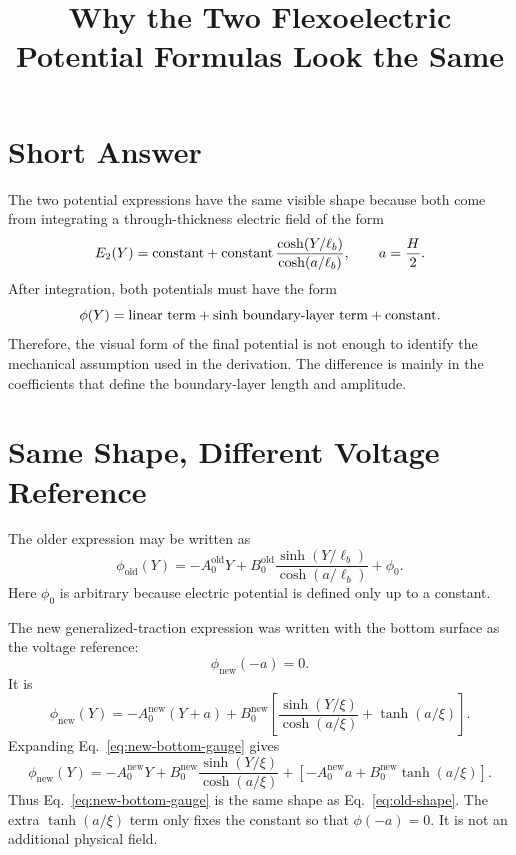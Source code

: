 \documentclass[11pt]{article}
\title{Why the Two Flexoelectric Potential Formulas Look the Same}
\author{}
\date{}
\begin{document}
\maketitle

\section{Short Answer}

The two potential expressions have the same visible shape because both come from
integrating a through-thickness electric field of the form
\[
  E_2(Y)=\hbox{constant}
  +\hbox{constant}\,
  \frac{\cosh(Y/\ell_b)}{\cosh(a/\ell_b)},
  \qquad a=\frac{H}{2}.
\]
After integration, both potentials must have the form
\[
  \phi(Y)
  =
  \hbox{linear term}
  +
  \hbox{sinh boundary-layer term}
  +
  \hbox{constant}.
\]
Therefore, the visual form of the final potential is not enough to identify the
mechanical assumption used in the derivation.  The difference is mainly in the
coefficients that define the boundary-layer length and amplitude.

\section{Same Shape, Different Voltage Reference}

The older expression may be written as
\begin{equation}
  \phi_{\mathrm{old}}(Y)
  =
  -A_0^{\mathrm{old}}Y
  +
  B_0^{\mathrm{old}}
  \frac{\sinh(Y/\ell_b)}{\cosh(a/\ell_b)}
  +
  \phi_0 .
  \label{eq:old-shape}
\end{equation}
Here \(\phi_0\) is arbitrary because electric potential is defined only up to a
constant.

The new generalized-traction expression was written with the bottom surface as
the voltage reference:
\[
  \phi_{\mathrm{new}}(-a)=0.
\]
It is
\begin{equation}
  \phi_{\mathrm{new}}(Y)
  =
  -A_0^{\mathrm{new}}(Y+a)
  +
  B_0^{\mathrm{new}}
  \left[
    \frac{\sinh(Y/\xi)}{\cosh(a/\xi)}
    +
    \tanh(a/\xi)
  \right].
  \label{eq:new-bottom-gauge}
\end{equation}
Expanding Eq.~\eqref{eq:new-bottom-gauge} gives
\begin{equation}
  \phi_{\mathrm{new}}(Y)
  =
  -A_0^{\mathrm{new}}Y
  +
  B_0^{\mathrm{new}}
  \frac{\sinh(Y/\xi)}{\cosh(a/\xi)}
  +
  \left[
    -A_0^{\mathrm{new}}a
    +
    B_0^{\mathrm{new}}\tanh(a/\xi)
  \right].
  \label{eq:new-expanded}
\end{equation}
Thus Eq.~\eqref{eq:new-bottom-gauge} is the same shape as
Eq.~\eqref{eq:old-shape}.  The extra \(\tanh(a/\xi)\) term only fixes the
constant so that \(\phi(-a)=0\).  It is not an additional physical field.
\end{document}
